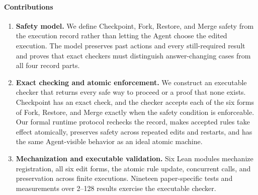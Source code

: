 \paragraph{Contributions}
\begin{enumerate}[leftmargin=*,itemsep=2pt,topsep=2pt]
\item \textbf{Safety model.}
We define Checkpoint, Fork, Restore, and Merge safety from the execution record rather than letting the Agent choose the edited execution.
The model preserves past actions and every still-required result and proves that exact checkers must distinguish answer-changing cases from all four record parts.

\item \textbf{Exact checking and atomic enforcement.}
We construct an executable checker that returns every safe way to proceed or a proof that none exists.
Checkpoint has an exact check, and the checker accepts each of the six forms of Fork, Restore, and Merge exactly when the safety condition is enforceable.
Our formal runtime protocol rechecks the record, makes accepted rules take effect atomically, preserves safety across repeated edits and restarts, and has the same Agent-visible behavior as an ideal atomic machine.

\item \textbf{Mechanization and executable validation.}
Six Lean modules mechanize registration, all six edit forms, the atomic rule update, concurrent calls, and preservation across finite executions.
Nineteen paper-specific tests and measurements over 2--128 results exercise the executable checker.
\end{enumerate}
